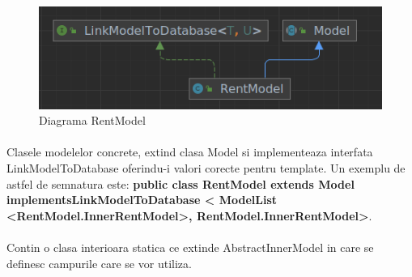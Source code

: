\documentclass[oneside]{article}
\begin{document}
\begin{figure}[ht]
    \centering
    \noindent\includegraphics[scale=0.7]{rentmodel.png}
    \caption{Diagrama RentModel}
    \label{fig:rentmodel}
\end{figure}

\paragraph{} Clasele modelelor concrete, extind clasa Model si implementeaza interfata LinkModelToDatabase oferindu-i valori corecte pentru template. Un exemplu de astfel de semnatura este: \textbf{public class RentModel extends Model implementsLinkModelToDatabase < ModelList <RentModel.InnerRentModel>, RentModel.InnerRentModel>}.

\paragraph{} Contin o clasa interioara statica ce extinde AbstractInnerModel in care se definesc campurile care se vor utiliza.
\end{document}
